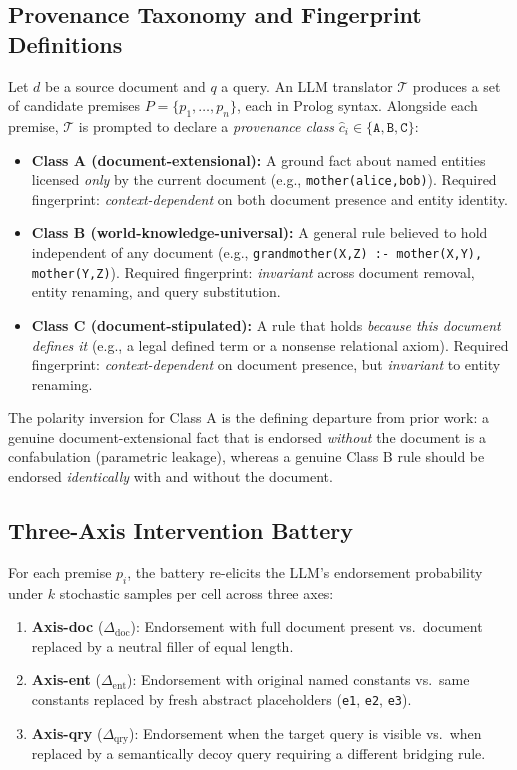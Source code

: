 \documentclass[11pt,letterpaper]{article}
\begin{document}
\subsection{Provenance Taxonomy and Fingerprint Definitions}

Let $d$ be a source document and $q$ a query. An LLM translator $\mathcal{T}$ produces a set of candidate premises $P = \{p_1, \ldots, p_n\}$, each in Prolog syntax. Alongside each premise, $\mathcal{T}$ is prompted to declare a \textit{provenance class} $\hat{c}_i \in \{\texttt{A}, \texttt{B}, \texttt{C}\}$:

\begin{itemize}
  \item \textbf{Class A (document-extensional):} A ground fact about named entities licensed \textit{only} by the current document (e.g., \texttt{mother(alice,bob)}). Required fingerprint: \textit{context-dependent} on both document presence and entity identity.
  \item \textbf{Class B (world-knowledge-universal):} A general rule believed to hold independent of any document (e.g., \texttt{grandmother(X,Z) :- mother(X,Y), mother(Y,Z)}). Required fingerprint: \textit{invariant} across document removal, entity renaming, and query substitution.
  \item \textbf{Class C (document-stipulated):} A rule that holds \textit{because this document defines it} (e.g., a legal defined term or a nonsense relational axiom). Required fingerprint: \textit{context-dependent} on document presence, but \textit{invariant} to entity renaming.
\end{itemize}

The polarity inversion for Class A is the defining departure from prior work: a genuine document-extensional fact that is endorsed \textit{without} the document is a confabulation (parametric leakage), whereas a genuine Class B rule should be endorsed \textit{identically} with and without the document.

\subsection{Three-Axis Intervention Battery}

For each premise $p_i$, the battery re-elicits the LLM's endorsement probability under $k$ stochastic samples per cell across three axes:

\begin{enumerate}
  \item \textbf{Axis-doc} ($\Delta_{\mathrm{doc}}$): Endorsement with full document present vs.\ document replaced by a neutral filler of equal length.
  \item \textbf{Axis-ent} ($\Delta_{\mathrm{ent}}$): Endorsement with original named constants vs.\ same constants replaced by fresh abstract placeholders (\texttt{e1}, \texttt{e2}, \texttt{e3}).
  \item \textbf{Axis-qry} ($\Delta_{\mathrm{qry}}$): Endorsement when the target query is visible vs.\ when replaced by a semantically decoy query requiring a different bridging rule.
\end{enumerate}
\end{document}
